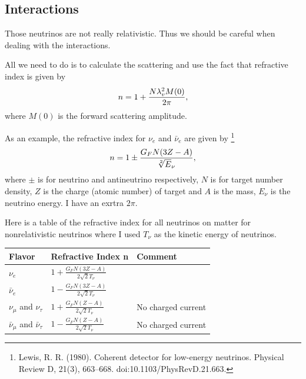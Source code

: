 \documentclass[letterpaper,12pt,english]{sphinxmanual}
\begin{document}
\subsection{Interactions}
\label{cosmology:interactions}
Those neutrinos are not really relativistic. Thus we should be careful when dealing with the interactions.

All we need to do is to calculate the scattering and use the fact that refractive index is given by \footnotemark[1]
\begin{gather}
\begin{split}n = 1 + \frac{N \lambda_v^2 M(0)}{2\pi},\end{split}\notag
\end{gather}
where \(M(0)\) is the forward scattering amplitude.

As an example, the refractive index for \(\nu_e\) and \(\bar\nu_e\) are given by \footnote{
Lewis, R. R. (1980). Coherent detector for low-energy neutrinos. Physical Review D, 21(3), 663–668. doi:10.1103/PhysRevD.21.663.
}
\begin{gather}
\begin{split}n = 1 \pm \frac{G_F N (3Z - A)}{\sqrt[2] E_\nu},\end{split}\notag
\end{gather}
where \(\pm\) is for neutrino and antineutrino respectively, \(N\) is for target number density, \(Z\) is the charge (atomic number) of target and \(A\) is the mass, \(E_\nu\) is the neutrino energy. \footnotemark[5] I have an exrtra \(2\pi\).

Here is a table of the refractive index for all neutrinos on matter for nonrelativistic neutrinos where I used \(T_\nu\) as the kinetic energy of neutrinos.

\begin{tabulary}{\linewidth}{|L|L|L|}
\hline

Flavor
 & 
Refractive Index n
 & 
Comment
\\
\hline
\(\nu_e\)
 & 
\(1+\frac{G_F N (3Z-A)}{2\sqrt{2}T_\nu}\)
 & \\
\hline
\(\bar\nu_e\)
 & 
\(1-\frac{G_F N (3Z-A)}{2\sqrt{2}T_\nu}\)
 & \\
\hline
\(\nu_\mu\) and \(\nu_\tau\)
 & 
\(1+\frac{G_F N (Z-A)}{2\sqrt{2}T_\nu}\)
 & 
No charged current
\\
\hline
\(\bar\nu_\mu\) and \(\bar\nu_\tau\)
 & 
\(1-\frac{G_F N (Z-A)}{2\sqrt{2}T_\nu}\)
 & 
No charged current
\\
\hline\end{tabulary}
\end{document}
